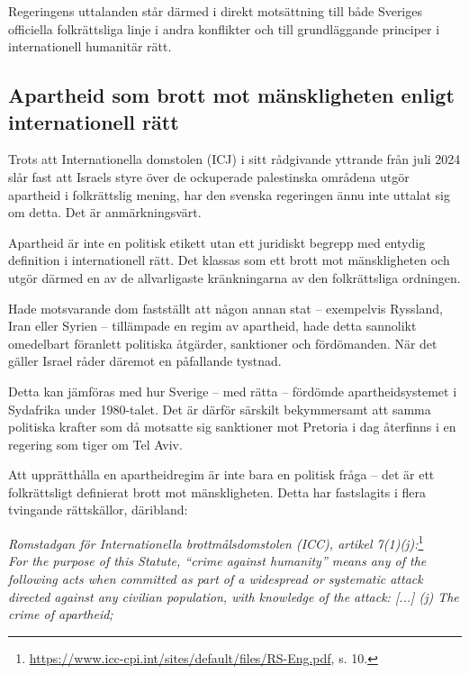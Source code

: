\documentclass[12pt]{article}
\newcommand{\utlandslagrum}[3]{%
  \vspace{3mm}%
  \noindent\textit{#1}\footnote{\url{#2}#3}\\[0.5ex]
}
\begin{document}
Regeringens uttalanden står därmed i direkt motsättning till både Sveriges officiella folkrättsliga linje i andra konflikter och till grundläggande principer i internationell humanitär rätt.



\subsection*{Apartheid som brott mot mänskligheten enligt internationell rätt}

Trots att Internationella domstolen (ICJ) i sitt rådgivande yttrande från juli 2024 slår fast att Israels styre över de ockuperade palestinska områdena utgör apartheid i folkrättslig mening, har den svenska regeringen ännu inte uttalat sig om detta. Det är anmärkningsvärt.

Apartheid är inte en politisk etikett utan ett juridiskt begrepp med entydig definition i internationell rätt. Det klassas som ett brott mot mänskligheten och utgör därmed en av de allvarligaste kränkningarna av den folkrättsliga ordningen.

Hade motsvarande dom fastställt att någon annan stat – exempelvis Ryssland, Iran eller Syrien – tillämpade en regim av apartheid, hade detta sannolikt omedelbart föranlett politiska åtgärder, sanktioner och fördömanden. När det gäller Israel råder däremot en påfallande tystnad.

Detta kan jämföras med hur Sverige – med rätta – fördömde apartheidsystemet i Sydafrika under 1980-talet. Det är därför särskilt bekymmersamt att samma politiska krafter som då motsatte sig sanktioner mot Pretoria i dag återfinns i en regering som tiger om Tel Aviv.

Att upprätthålla en apartheidregim är inte bara en politisk fråga – det är ett folkrättsligt definierat brott mot mänskligheten. Detta har fastslagits i flera tvingande rättskällor, däribland:

\utlandslagrum{Romstadgan för Internationella brottmålsdomstolen (ICC), artikel 7(1)(j):}{https://www.icc-cpi.int/sites/default/files/RS-Eng.pdf}{, s. 10.}
\textit{For the purpose of this Statute, “crime against humanity” means any of the following
acts when committed as part of a widespread or systematic attack directed against any
civilian population, with knowledge of the attack:  [...] (j) The crime of apartheid;}

\vspace{4mm}
\end{document}
